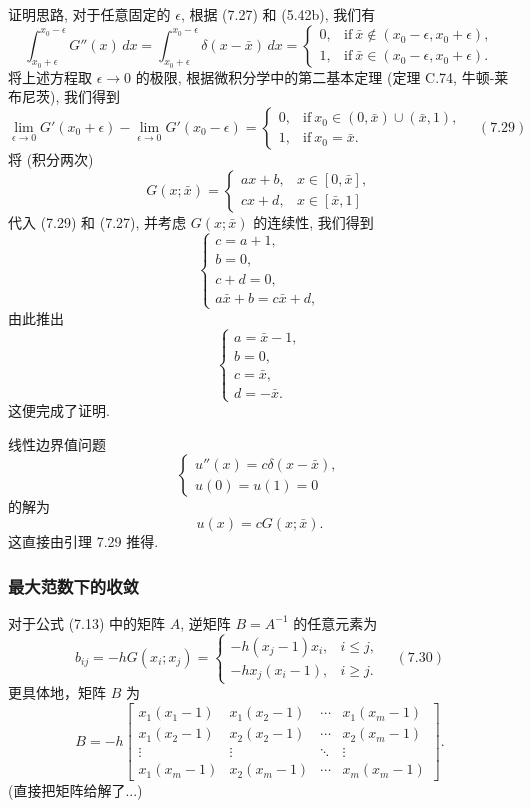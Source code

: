 \documentclass[a4paper]{ctexart}
\newcommand{\hl}[1]
{\noindent {\bf {#1}}}
\begin{document}
证明思路, 对于任意固定的 $\epsilon$, 根据 (7.27) 和 (5.42b), 我们有
$$
\int_{x_0 + \epsilon}^{x_0 - \epsilon} G''(x) \, dx 
= \int_{x_0 + \epsilon}^{x_0 - \epsilon} \delta(x - \bar{x}) \, dx = 
\begin{cases}
0, & \text{if} \ \bar{x} \notin (x_0 - \epsilon, x_0 + \epsilon), \\
1, & \text{if} \ \bar{x} \in (x_0 - \epsilon, x_0 + \epsilon).
\end{cases}
$$
将上述方程取 $\epsilon \to 0$ 的极限, 根据微积分学中的第二基本定理 
(定理 C.74, 牛顿-莱布尼茨), 我们得到
$$
\lim_{\epsilon \to 0} G'(x_0 + \epsilon) - \lim_{\epsilon \to 0} 
G'(x_0 - \epsilon) = \begin{cases}
0, & \text{if} \ x_0 \in (0, \bar{x}) \cup (\bar{x}, 1), \\
1, & \text{if} \ x_0 = \bar{x}.
\end{cases} \quad (7.29)
$$
将 (积分两次)
$$
G(x; \bar{x}) = \begin{cases} 
  ax + b, & x \in [0, \bar{x}], \\
  cx + d, & x \in [\bar{x}, 1] \end{cases}
$$ 
代入 (7.29) 和 (7.27), 并考虑 $G(x; \bar{x})$ 的连续性, 我们得到
$$
\begin{cases}
c = a + 1, \\
b = 0, \\
c + d = 0, \\
a\bar{x} + b = c\bar{x} + d,
\end{cases}
$$
由此推出
$$
\begin{cases}
a = \bar{x} - 1, \\
b = 0, \\
c = \bar{x}, \\
d = -\bar{x}.
\end{cases}
$$
这便完成了证明. 

\hl{推论 7.30} 线性边界值问题
$$
\begin{cases}
u''(x) = c\delta(x - \bar{x}), \\
u(0) = u(1) = 0
\end{cases}
$$
的解为
$$
u(x) = cG(x; \bar{x}).
$$
这直接由引理 7.29 推得.

\subsubsection{最大范数下的收敛}

\hl{引理 7.31} 对于公式 (7.13) 中的矩阵 $A$, 逆矩阵 $B = A^{-1}$ 的任意元素为
$$
b_{ij} = -hG(x_i; x_j) = \begin{cases}
-h(x_j - 1)x_i, & i \leq j, \\
-hx_j(x_i - 1), & i \geq j.
\end{cases} \quad (7.30)
$$
更具体地，矩阵 $B$ 为
$$
B = -h \begin{bmatrix}
x_1(x_1 - 1) & x_1(x_2 - 1) & \cdots & x_1(x_m - 1) \\
x_1(x_2 - 1) & x_2(x_2 - 1) & \cdots & x_2(x_m - 1) \\
\vdots & \vdots & \ddots & \vdots \\
x_1(x_m - 1) & x_2(x_m - 1) & \cdots & x_m(x_m - 1)
\end{bmatrix}.
$$
(直接把矩阵给解了...)
\end{document}
